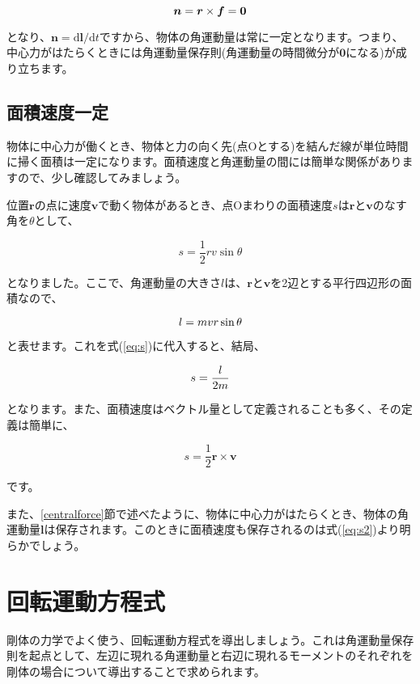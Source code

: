 \begin{equation}
    \bm{n}=\bm{r}\times\bm{f}=\bm{0} \notag
\end{equation}

となり、$\bm{n}=\mathrm{d}\bm{l}/\mathrm{d}t$ですから、物体の角運動量は常に一定となります。つまり、中心力がはたらくときには角運動量保存則(角運動量の時間微分が$\bm{0}$になる)が成り立ちます。



\subsection{面積速度一定}
\label{areavelocity}
物体に中心力が働くとき、物体と力の向く先(点Oとする)を結んだ線が単位時間に掃く面積は一定になります。面積速度と角運動量の間には簡単な関係がありますので、少し確認してみましょう。

位置$\bm{r}$の点に速度$\bm{v}$で動く物体があるとき、点Oまわりの面積速度$s$は$\bm{r}$と$\bm{v}$のなす角を$\theta$として、

\begin{equation}
\label{eq:s}
    s = \frac{1}{2}rv\sin\theta
\end{equation}

となりました。ここで、角運動量の大きさ$l$は、$\bm{r}$と$\bm{v}$を2辺とする平行四辺形の面積なので、

\begin{equation}
    l = mvr\sin\theta \notag
\end{equation}

と表せます。これを式(\ref{eq:s})に代入すると、結局、

\begin{equation}
\label{eq:s2}
    s = \frac{l}{2m} \notag
\end{equation}

となります。また、面積速度はベクトル量として定義されることも多く、その定義は簡単に、

\begin{equation}
    s = \frac{1}{2}\bm{r}\times\bm{v}
\end{equation}

です。

また、\ref{centralforce}節で述べたように、物体に中心力がはたらくとき、物体の角運動量$\bm{l}$は保存されます。このときに面積速度も保存されるのは式(\ref{eq:s2})より明らかでしょう。




\section{回転運動方程式}
\label{rotationequation}
剛体の力学でよく使う、回転運動方程式を導出しましょう。これは角運動量保存則を起点として、左辺に現れる角運動量と右辺に現れるモーメントのそれぞれを剛体の場合について導出することで求められます。

